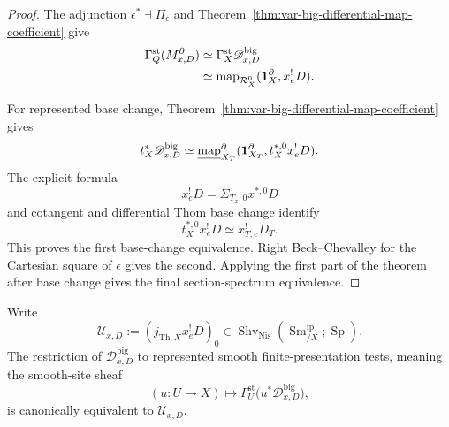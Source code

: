 \begin{proof}
The adjunction \(\epsilon^*\dashv\Pi_\epsilon\) and Theorem~\ref{thm:var-big-differential-map-coefficient} give
\[
\begin{aligned}
    \Gamma_Q^{\mathrm{st}}(M^\partial_{x,D})
    &\simeq
    \Gamma_X^{\mathrm{st}}
    \mathscr D_{x,D}^{\mathrm{big}}
    \\
    &\simeq
    \operatorname{map}_{\mathcal R_X^0}
    (\mathbf 1_X^\partial,x_e^!D).
\end{aligned}
\]

For represented base change, Theorem~\ref{thm:var-big-differential-map-coefficient} gives
\[
    t_X^*\mathscr D_{x,D}^{\mathrm{big}}
    \simeq
    \underline{\operatorname{map}}^{\partial}_{X_T}
    (\mathbf 1_{X_T}^\partial,t_X^{*,0}x_e^!D).
\]
The explicit formula
\[
    x_e^!D=\Sigma_{T_x,0}x^{*,0}D
\]
and cotangent and differential Thom base change identify
\[
    t_X^{*,0}x_e^!D
    \simeq
    x_{T,e}^!D_T.
\]
This proves the first base-change equivalence. Right Beck--Chevalley for the Cartesian square of \(\epsilon\) gives the second. Applying the first part of the theorem after base change gives the final section-spectrum equivalence.
\end{proof}

\begin{proposition}
\label{prop:var-density-smooth-comparison}
Write
\[
    \mathscr U_{x,D}:=(j_{\mathrm{Th},X}x_e^!D)_0
    \in
    \operatorname{Shv}_{\mathrm{Nis}}
    (\operatorname{Sm}^{\mathrm{fp}}_{/X};\operatorname{Sp}).
\]
The restriction of \(\mathscr D_{x,D}^{\mathrm{big}}\) to represented smooth finite-presentation tests, meaning the smooth-site sheaf
\[
    (u:U\to X)
    \longmapsto
    \Gamma_U^{\mathrm{st}}
    \bigl(u^*\mathscr D_{x,D}^{\mathrm{big}}\bigr),
\]
is canonically equivalent to \(\mathscr U_{x,D}\).
\end{proposition}

